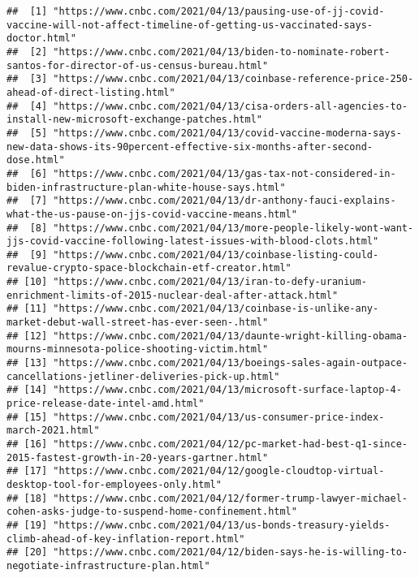 \documentclass[
]{article}
\begin{document}
\begin{verbatim}
##  [1] "https://www.cnbc.com/2021/04/13/pausing-use-of-jj-covid-vaccine-will-not-affect-timeline-of-getting-us-vaccinated-says-doctor.html" 
##  [2] "https://www.cnbc.com/2021/04/13/biden-to-nominate-robert-santos-for-director-of-us-census-bureau.html"                              
##  [3] "https://www.cnbc.com/2021/04/13/coinbase-reference-price-250-ahead-of-direct-listing.html"                                          
##  [4] "https://www.cnbc.com/2021/04/13/cisa-orders-all-agencies-to-install-new-microsoft-exchange-patches.html"                            
##  [5] "https://www.cnbc.com/2021/04/13/covid-vaccine-moderna-says-new-data-shows-its-90percent-effective-six-months-after-second-dose.html"
##  [6] "https://www.cnbc.com/2021/04/13/gas-tax-not-considered-in-biden-infrastructure-plan-white-house-says.html"                          
##  [7] "https://www.cnbc.com/2021/04/13/dr-anthony-fauci-explains-what-the-us-pause-on-jjs-covid-vaccine-means.html"                        
##  [8] "https://www.cnbc.com/2021/04/13/more-people-likely-wont-want-jjs-covid-vaccine-following-latest-issues-with-blood-clots.html"       
##  [9] "https://www.cnbc.com/2021/04/13/coinbase-listing-could-revalue-crypto-space-blockchain-etf-creator.html"                            
## [10] "https://www.cnbc.com/2021/04/13/iran-to-defy-uranium-enrichment-limits-of-2015-nuclear-deal-after-attack.html"                      
## [11] "https://www.cnbc.com/2021/04/13/coinbase-is-unlike-any-market-debut-wall-street-has-ever-seen-.html"                                
## [12] "https://www.cnbc.com/2021/04/13/daunte-wright-killing-obama-mourns-minnesota-police-shooting-victim.html"                           
## [13] "https://www.cnbc.com/2021/04/13/boeings-sales-again-outpace-cancellations-jetliner-deliveries-pick-up.html"                         
## [14] "https://www.cnbc.com/2021/04/13/microsoft-surface-laptop-4-price-release-date-intel-amd.html"                                       
## [15] "https://www.cnbc.com/2021/04/13/us-consumer-price-index-march-2021.html"                                                            
## [16] "https://www.cnbc.com/2021/04/12/pc-market-had-best-q1-since-2015-fastest-growth-in-20-years-gartner.html"                           
## [17] "https://www.cnbc.com/2021/04/12/google-cloudtop-virtual-desktop-tool-for-employees-only.html"                                       
## [18] "https://www.cnbc.com/2021/04/12/former-trump-lawyer-michael-cohen-asks-judge-to-suspend-home-confinement.html"                      
## [19] "https://www.cnbc.com/2021/04/13/us-bonds-treasury-yields-climb-ahead-of-key-inflation-report.html"                                  
## [20] "https://www.cnbc.com/2021/04/12/biden-says-he-is-willing-to-negotiate-infrastructure-plan.html"
\end{verbatim}
\end{document}
